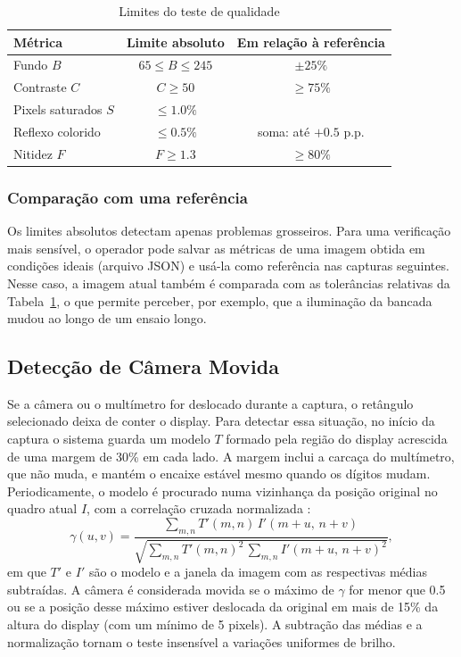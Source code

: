 \documentclass[10pt,twocolumn,letterpaper]{article}
\begin{document}
\begin{table}[!t]
\centering
\caption{Limites do teste de qualidade}
\label{tab:limites}
\footnotesize
\begin{tabular}{@{}l c c@{}}
\toprule
Métrica & Limite absoluto & Em relação à referência \\
\midrule
Fundo $B$          & $65 \le B \le 245$  & $\pm 25\%$ \\
Contraste $C$      & $C \ge 50$          & $\ge 75\%$ \\
Pixels saturados $S$ & $\le 1.0\%$       & \\
Reflexo colorido   & $\le 0.5\%$         & soma: até $+0.5$ p.p. \\
Nitidez $F$        & $F \ge 1.3$         & $\ge 80\%$ \\
\bottomrule
\end{tabular}
\end{table}

\subsubsection{Comparação com uma referência}
Os limites absolutos detectam apenas problemas grosseiros. Para uma verificação
mais sensível, o operador pode salvar as métricas de uma imagem obtida em
condições ideais (arquivo JSON) e usá-la como referência nas capturas
seguintes. Nesse caso, a imagem atual também é comparada com as tolerâncias
relativas da Tabela~\ref{tab:limites}, o que permite perceber, por exemplo, que
a iluminação da bancada mudou ao longo de um ensaio longo.

\subsection{Detecção de Câmera Movida}

Se a câmera ou o multímetro for deslocado durante a captura, o retângulo
selecionado deixa de conter o display. Para detectar essa situação, no início
da captura o sistema guarda um modelo $T$ formado pela região do display
acrescida de uma margem de 30\% em cada lado. A margem inclui a carcaça do
multímetro, que não muda, e mantém o encaixe estável mesmo quando os dígitos
mudam. Periodicamente, o modelo é procurado numa vizinhança da posição original
no quadro atual $I$, com a correlação cruzada normalizada \cite{lewis}:
\begin{equation}
  \gamma(u,v) = \frac{\sum_{m,n} T'(m,n)\, I'(m+u,\, n+v)}
  {\sqrt{\sum_{m,n} T'(m,n)^2 \, \sum_{m,n} I'(m+u,\, n+v)^2}},
  \label{eq:ncc}
\end{equation}
em que $T'$ e $I'$ são o modelo e a janela da imagem com as respectivas médias
subtraídas. A câmera é considerada movida se o máximo de $\gamma$ for menor que
0.5 ou se a posição desse máximo estiver deslocada da original em mais de 15\%
da altura do display (com um mínimo de 5 pixels). A subtração das médias e a
normalização tornam o teste insensível a variações uniformes de brilho.
\end{document}
